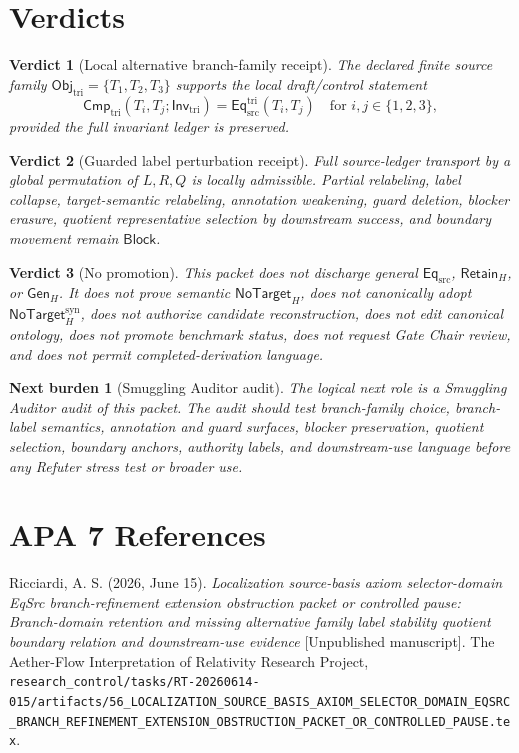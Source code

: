 \documentclass[11pt]{article}
\newcommand{\EqSrc}{\mathsf{Eq}_{\mathrm{src}}}
\newcommand{\EqTri}{\mathsf{Eq}_{\mathrm{src}}^{\mathrm{tri}}}
\newcommand{\ObjTri}{\mathsf{Obj}_{\mathrm{tri}}}
\newcommand{\InvTri}{\mathsf{Inv}_{\mathrm{tri}}}
\newcommand{\CmpTri}{\mathsf{Cmp}_{\mathrm{tri}}}
\newcommand{\RetainH}{\mathsf{Retain}_{H}}
\newcommand{\GenH}{\mathsf{Gen}_{H}}
\newcommand{\NoTargetH}{\mathsf{NoTarget}_{H}}
\newcommand{\NoTargetSyn}{\mathsf{NoTarget}_{H}^{\mathrm{syn}}}
\newcommand{\Block}{\mathsf{Block}}
\newtheorem{verdict}{Verdict}
\newtheorem{nextburden}{Next burden}
\begin{document}
\section{Verdicts}

\begin{verdict}[Local alternative branch-family receipt]
The declared finite source family \(\ObjTri=\{T_{1},T_{2},T_{3}\}\)
supports the local draft/control statement
\[
    \CmpTri(T_i,T_j;\InvTri)=\EqTri(T_i,T_j)
    \quad\text{for }i,j\in\{1,2,3\},
\]
provided the full invariant ledger is preserved.
\end{verdict}

\begin{verdict}[Guarded label perturbation receipt]
Full source-ledger transport by a global permutation of \(L,R,Q\) is
locally admissible. Partial relabeling, label collapse,
target-semantic relabeling, annotation weakening, guard deletion,
blocker erasure, quotient representative selection by downstream
success, and boundary movement remain \(\Block\).
\end{verdict}

\begin{verdict}[No promotion]
This packet does not discharge general \(\EqSrc\), \(\RetainH\), or
\(\GenH\). It does not prove semantic \(\NoTargetH\), does not
canonically adopt \(\NoTargetSyn\), does not authorize candidate
reconstruction, does not edit canonical ontology, does not promote
benchmark status, does not request Gate Chair review, and does not permit
completed-derivation language.
\end{verdict}

\begin{nextburden}[Smuggling Auditor audit]
The logical next role is a Smuggling Auditor audit of this packet. The
audit should test branch-family choice, branch-label semantics,
annotation and guard surfaces, blocker preservation, quotient selection,
boundary anchors, authority labels, and downstream-use language before
any Refuter stress test or broader use.
\end{nextburden}

\section*{APA 7 References}

Ricciardi, A. S. (2026, June 15). \emph{Localization source-basis axiom
selector-domain EqSrc branch-refinement extension obstruction packet or
controlled pause: Branch-domain retention and missing alternative family
label stability quotient boundary relation and downstream-use evidence}
[Unpublished manuscript]. The Aether-Flow Interpretation of Relativity
Research Project,
\texttt{research\_control/tasks/RT-20260614-015/artifacts/56\_LOCALIZATION\_SOURCE\_BASIS\_AXIOM\_SELECTOR\_DOMAIN\_EQSRC\_BRANCH\_REFINEMENT\_EXTENSION\_OBSTRUCTION\_PACKET\_OR\_CONTROLLED\_PAUSE.tex}.
\end{document}
